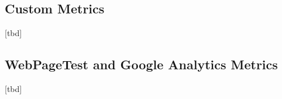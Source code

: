 










\subsection{Custom Metrics}


[tbd]















\subsection{WebPageTest and Google Analytics Metrics}

[tbd]




